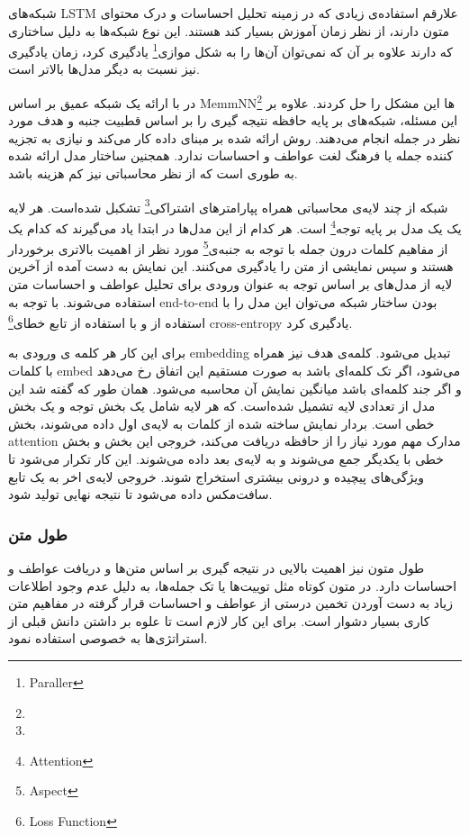 \documentclass[12pt, a4paper, oneside]{report}
\begin{document}
شبکه‌های
LSTM
علارقم استفاده‌ی زیادی که در زمینه تحلیل احساسات و درک محتوای متون دارند، از نظر زمان آموزش بسیار کند هستند.
این نوع شبکه‌ها به دلیل ساختاری که دارند علاوه بر آن که نمی‌توان آن‌ها را به شکل 
موازی\footnote{Paraller}
یادگیری کرد، زمان یادگیری نیز نسبت به دیگر مدل‌ها بالاتر است.

در
\cite{76tang2016aspect}
با ارائه یک شبکه عمیق بر اساس
MemmNN\footnote{}
ها این مشکل را حل کردند. علاوه بر این مسئله، شبکه‌های بر پایه حافظه نتیجه گیری را بر اساس قطبیت جنبه
و هدف مورد نظر در جمله انجام می‌دهند. روش ارائه شده بر مبنای داده کار می‌کند و نیازی به تجزیه کننده جمله یا
فرهنگ لغت عواطف و احساسات ندارد. همجنین ساختار مدل ارائه شده به طوری است که از نظر محاسباتی نیز کم هزینه باشد.

شبکه از چند لایه‌ی محاسباتی همراه 
پپارامتر‌های اشتراکی\footnote{}
تشکبل شده‌است. هر لایه یک یک مدل بر پایه
توجه\footnote{Attention}
است. هر کدام از این مدل‌ها در ابتدا یاد می‌گیرند که کدام یک از مفاهیم کلمات درون جمله با توجه به
جنبه‌ی\footnote{Aspect}
مورد نظر از اهمیت بالاتری برخوردار هستند و سپس نمایشی از متن را یادگیری می‌کنند.
این نمایش به دست آمده از آخرین لایه از مدل‌های بر اساس توجه به عنوان ورودی برای تحلیل عواطف و احساسات
متن استفاده می‌شوند. با توجه به
end-to-end
بودن ساختار شبکه می‌توان این مدل را با استفاده از 
و با استفاده از
تابع خطای\footnote{Loss Function}
cross-entropy
یادگیری کرد.

برای این کار هر کلمه ی ورودی به
embedding
تبدیل می‌شود. کلمه‌ی هدف نیز همراه با کلمات
embed
می‌شود، اگر تک کلمه‌ای باشد به صورت مستقیم این اتفاق رخ می‌دهد و اگر جند کلمه‌ای باشد میانگین نمایش
آن محاسبه می‌شود. همان طور که گفته شد این مدل از تعدادی لایه تشمیل شده‌است. که هر لایه شامل یک
بخش توجه و یک بخش خطی است.
بردار نمایش ساخته شده از کلمات به لایه‌ی اول داده می‌شوند، بخش
attention
مدارک مهم مورد نیاز را از حافظه دریافت می‌کند، خروجی این بخش و بخش خطی با یکدیگر جمع می‌شوند
و به لایه‌ی بعد داده می‌شوند. این کار تکرار می‌شود تا ویژگی‌های پیچیده و درونی بیشتری استخراج شوند. خروجی
لایه‌ی اخر به یک تابع سافت‌مکس داده می‌شود تا نتیجه نهایی تولید شود.


\subsubsection{طول متن}

طول متون نیز اهمیت بالایی در نتیجه گیری بر اساس متن‌ها و دریافت عواطف و احساسات دارد.
در متون کوتاه مثل توییت‌ها یا تک جمله‌ها، به دلیل عدم وجود اطلاعات زیاد به دست آوردن تخمین درستی از
عواطف و احساسات قرار گرفته در مفاهیم متن کاری بسیار دشوار است.
برای این کار لازم است تا علوه بر داشتن دانش قبلی از استراتژی‌ها به خصوصی استفاده نمود.
\end{document}
